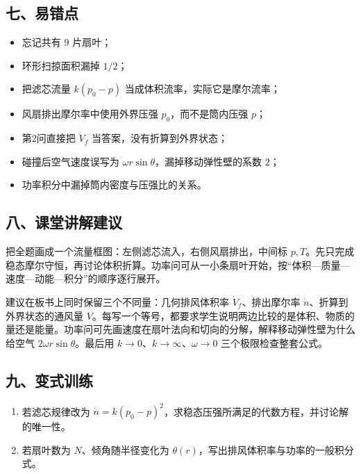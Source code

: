 \documentclass[12pt,a4paper,UTF8]{ctexart}
\newcommand{\tightlist}{\setlength{\itemsep}{0pt}\setlength{\parskip}{0pt}}
\begin{document}
\subsection{七、易错点}\label{ux4e03ux6613ux9519ux70b9-7}

\begin{itemize}
\tightlist
\item
  忘记共有 \(9\) 片扇叶；
\item
  环形扫掠面积漏掉 \(1/2\)；
\item
  把滤芯流量 \(k(p_0-p)\) 当成体积流率，实际它是摩尔流率；
\item
  风扇排出摩尔率中使用外界压强 \(p_0\)，而不是筒内压强 \(p\)；
\item
  第2问直接把 \(\dot V_f\) 当答案，没有折算到外界状态；
\item
  碰撞后空气速度误写为 \(\omega r\sin\theta\)，漏掉移动弹性壁的系数
  \(2\)；
\item
  功率积分中漏掉筒内密度与压强比的关系。
\end{itemize}

\subsection{八、课堂讲解建议}\label{ux516bux8bfeux5802ux8bb2ux89e3ux5efaux8bae-7}

把全题画成一个流量框图：左侧滤芯流入，右侧风扇排出，中间标
\(p,T\)。先只完成稳态摩尔守恒，再讨论体积折算。功率问可从一小条扇叶开始，按``体积---质量---速度---动能---积分''的顺序逐行展开。

建议在板书上同时保留三个不同量：几何排风体积率 \(\dot V_f\)、排出摩尔率
\(\dot n\)、折算到外界状态的通风量
\(V\)。每写一个等号，都要求学生说明两边比较的是体积、物质的量还是能量。功率问可先画速度在扇叶法向和切向的分解，解释移动弹性壁为什么给空气
\(2\omega r\sin\theta\)。最后用
\(k\to0\)、\(k\to\infty\)、\(\omega\to0\) 三个极限检查整套公式。

\subsection{九、变式训练}\label{ux4e5dux53d8ux5f0fux8badux7ec3-7}

\begin{enumerate}
\def\labelenumi{\arabic{enumi}.}
\tightlist
\item
  若滤芯规律改为
  \(\dot n=k(p_0-p)^2\)，求稳态压强所满足的代数方程，并讨论解的唯一性。
\item
  若扇叶数为 \(N\)、倾角随半径变化为
  \(\theta(r)\)，写出排风体积率与功率的一般积分式。
\end{enumerate}
\end{document}
